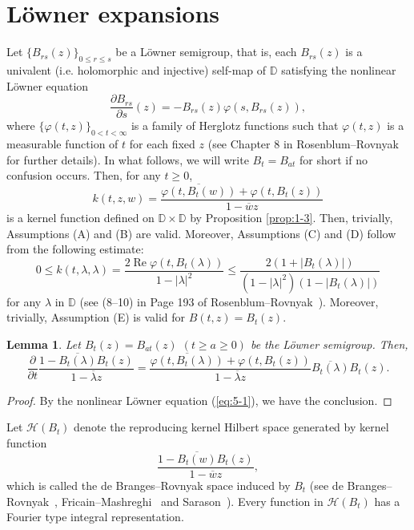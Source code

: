 \documentclass[12pt]{article}
\newtheorem{lem}[thm]{Lemma}
\numberwithin{equation}{section}
\newcommand{\D}{{\mathbb D}}
\newcommand{\cH}{{\mathcal H}}
\newcommand{\Real}{\operatorname{Re}}
\newcommand{\p}{\partial}
\newcommand{\lam}{\lambda}
\begin{document}
\section{L\"{o}wner expansions}
Let $\{B_{rs}(z)\}_{0\leq r\leq s}$ be a L\"{o}wner semigroup, that is, 
each $B_{rs}(z)$ is a univalent (i.e. holomorphic and injective) self-map of $\D$ satisfying 
the nonlinear L\"{o}wner equation
\begin{equation}\label{eq:5-1}
\frac{\p B_{rs}}{\p s}(z)=-B_{rs}(z)\varphi(s,B_{rs}(z)),
\end{equation}
where $\{\varphi(t,z)\}_{0<t<\infty}$ is a family of Herglotz functions such that 
$\varphi(t,z)$ is a measurable function of $t$ for each fixed $z$ 
(see Chapter 8 in Rosenblum--Rovnyak~\cite{RR} for further details). 
In what follows, we will write $B_t=B_{at}$ for short if no confusion occurs. 
Then, for any $t\geq 0$,
\[
k(t, z,w)=\frac{\overline{\varphi(t,B_t(w))}+\varphi(t,B_t(z))}{1-\overline{w} z}
\]
is a kernel function defined on $\D\times \D$ by Proposition \ref{prop:1-3}. 
Then, trivially, Assumptions (A) and (B) are valid. 
Moreover, Assumptions (C) and (D) follow from the following estimate:
\begin{equation*}
0\leq k(t,\lam,\lam)=\dfrac{2\Real\varphi(t,B_t(\lam))}{1-|\lam|^2}\leq 
\dfrac{2(1+|B_t(\lam)|)}{(1-|\lam|^2)(1-|B_t(\lam)|)}
\end{equation*}
for any $\lam$ in $\D$ (see (8--10) in Page 193 of Rosenblum--Rovnyak~\cite{RR}). 
Moreover, trivially, Assumption (E) is valid for $B(t,z)=B_t(z)$.  

\begin{lem}\label{lem:2-1}
Let $B_t(z)=B_{at}(z)$ $(t\geq a\geq 0)$ be the L\"{o}wner semigroup. Then, 
\[
\dfrac{\p}{\p t} \dfrac{1-\overline{B_{t}(\lam)}B_{t}(z)}{1-\overline{\lam}z}
=\dfrac{\overline{\varphi(t,B_{t}(\lam))}+\varphi(t,B_{t}(z))}{1-\overline{\lam}z}
\overline{B_{t}(\lam)}B_{t}(z).
\]
\end{lem}

\begin{proof}
By the nonlinear L\"{o}wner equation (\ref{eq:5-1}), 
we have the conclusion. 
\end{proof}

Let $\cH(B_t)$ denote the reproducing kernel Hilbert space 
generated by kernel function 
\[
\dfrac{1-\overline{B_t(w)}B_t(z)}{1-\overline{w}z},
\]
which is called the de Branges--Rovnyak space induced by $B_t$ (see de Branges--Rovnyak~\cite{dBR, dBR2}, 
Fricain--Mashreghi~\cite{FM} and Sarason~\cite{Sarason}). 
Every function in $\cH(B_t)$ has a Fourier type integral representation. 
\end{document}

